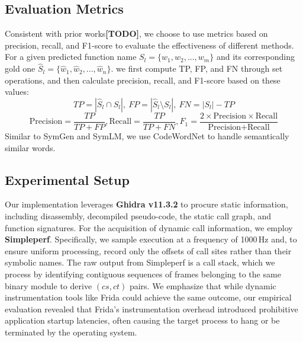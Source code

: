 \documentclass[acmsmall,screen,review,anonymous]{acmart} %
\begin{document}



\subsection{Evaluation Metrics}
Consistent with prior works\textbf{[TODO]}, we choose to use metrics based on precision, recall, and F1-score to evaluate the effectiveness of different methods. For a given predicted function name $S_l = \{w_1, w_2, ..., w_m\}$ and its corresponding gold one $\hat{S}_l = \{\hat{w}_1, \hat{w}_2, ..., \hat{w}_n\}$. we first compute TP, FP, and FN through set operations, and then calculate precision, recall, and F1-score based on these values:
$$
TP = |\hat{S}_l \cap S_l|, \ FP = |\hat{S}_l \setminus S_l|, \ FN = |S_l| - TP
$$
$$
\text{Precision} = \frac{TP}{TP + FP}, \text{Recall} = \frac{TP}{TP + FN}, F_{1} = \frac{2 \times \text{Precision} \times \text{Recall}}{\text{Precision} + \text{Recall}}
$$
Similar to SymGen and SymLM, we use CodeWordNet to handle semantically similar words.


\subsection{Experimental Setup}
Our implementation leverages \textbf{Ghidra v11.3.2} to procure static information, including disassembly, decompiled pseudo-code, the static call graph, and function signatures. For the acquisition of dynamic call information, we employ \textbf{Simpleperf}. Specifically, we sample execution at a frequency of 1000\,Hz and, to ensure uniform processing, record only the offsets of call sites rather than their symbolic names. The raw output from Simpleperf is a call stack, which we process by identifying contiguous sequences of frames belonging to the same binary module to derive \((cs, ct)\) pairs. We emphasize that while dynamic instrumentation tools like Frida could achieve the same outcome, our empirical evaluation revealed that Frida's instrumentation overhead introduced prohibitive application startup latencies, often causing the target process to hang or be terminated by the operating system.
\end{document}
